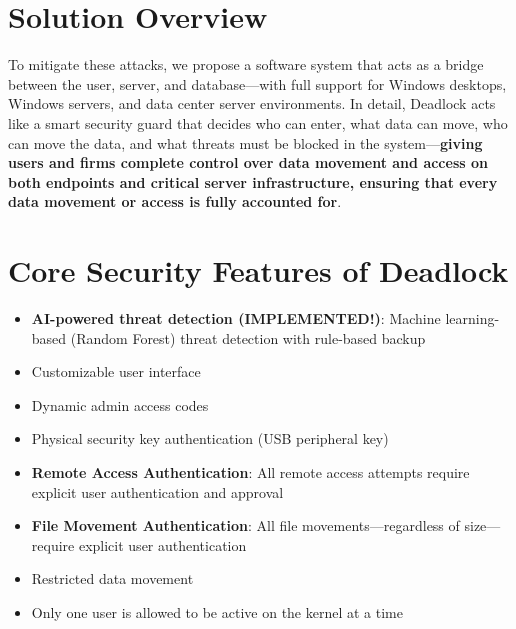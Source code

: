 \documentclass[12pt,letterpaper]{report}
\begin{document}
\section{Solution Overview}
To mitigate these attacks, we propose a software system that acts as a bridge between the user, server, and database---with full support for Windows desktops, Windows servers, and data center server environments. In detail, Deadlock acts like a smart security guard that decides who can enter, what data can move, who can move the data, and what threats must be blocked in the system---\textbf{giving users and firms complete control over data movement and access on both endpoints and critical server infrastructure, ensuring that every data movement or access is fully accounted for}.

\section{Core Security Features of Deadlock}
\begin{itemize}
    \item \textbf{AI-powered threat detection (IMPLEMENTED!)}: Machine learning-based (Random Forest) threat detection with rule-based backup
    \item Customizable user interface
    \item Dynamic admin access codes
    \item Physical security key authentication (USB peripheral key)
    \item \textbf{Remote Access Authentication}: All remote access attempts require explicit user authentication and approval
    \item \textbf{File Movement Authentication}: All file movements---regardless of size---require explicit user authentication
    \item Restricted data movement
    \item Only one user is allowed to be active on the kernel at a time
\end{itemize}
\end{document}

